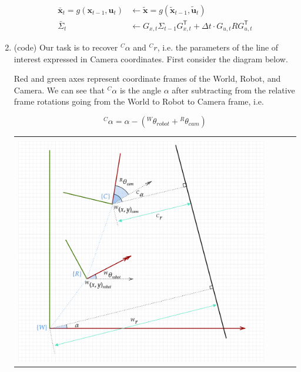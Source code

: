 \documentclass{article}
\begin{document}
\begin{enumerate}[label=(\roman*)]
\begin{equation}
\begin{aligned}
\bar{\mathbf{x}}_t = g(\mathbf{x}_{t-1}, \mathbf{u}_t) &\leftarrow \tilde{\mathbf{x}} = g(\tilde{\mathbf{x}}_{t-1}, \tilde{\mathbf{u}}_t) \\
\bar{\Sigma}_t &\leftarrow G_{x,t} \Sigma_{t-1} G_{x,t}^\mathsf{T} + \Delta t \cdot G_{u,t} R G_{u,t}^\mathsf{T}
\end{aligned}
\end{equation}

\item %
(code) Our task is to recover ${}^C\alpha$ and ${}^C r$, i.e. the parameters of the line of interest expressed in Camera coordinates. First consider the diagram below.

Red and green axes represent coordinate frames of the World, Robot, and Camera. We can see that ${}^C\alpha$ is the angle $\alpha$ after subtracting from the relative frame rotations going from the World to Robot to Camera frame, i.e.

\begin{equation}
{}^C\alpha = \alpha - ({}^W\theta_{robot} + {}^R\theta_{cam})
\end{equation}

\begin{tabular}[t]{l}
	\hline \\
	\includegraphics[width=0.9\textwidth]{img/diagram-1.png} \\
	\hline
\end{tabular}


\end{enumerate}
\end{document}
